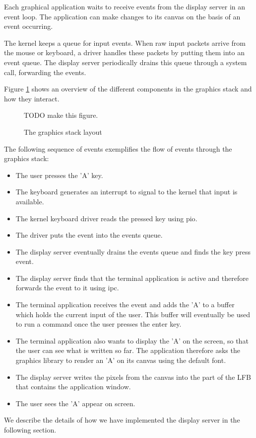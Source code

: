 \documentclass{report}
\begin{document}
Each graphical application waits to receive events from the display server in
an event loop. The application can make changes to its canvas on the basis of
an event occurring.

The kernel keeps a queue for input events. When raw input packets arrive from
the mouse or keyboard, a driver handles these packets by putting them into an
event queue. The display server periodically drains this queue through a
system call, forwarding the events.

Figure \ref{graphicslayout} shows an overview of the different components in
the graphics stack and how they interact. 
\begin{figure}[h!]
\begin{framed}
TODO make this figure.
\end{framed}
\caption{The graphics stack layout}
\label{graphicslayout}
\end{figure}

The following sequence of events exemplifies the flow of events through the
graphics stack:
\begin{itemize}
\item The user presses the 'A' key.
\item The keyboard generates an interrupt to signal to the kernel that input
is available.
\item The kernel keyboard driver reads the pressed key using \gls{pio}.
\item The driver puts the event into the events queue.
\item The display server eventually drains the events queue and finds the key
press event.
\item The display server finds that the terminal application is active and
therefore forwards the event to it using \gls{ipc}.
\item The terminal application receives the event and adds the 'A' to a buffer
which holds the current input of the user. This buffer will eventually be used
to run a command once the user presses the enter key.
\item The terminal application also wants to display the 'A' on the screen, so
that the user can see what is written so far. The application therefore asks
the graphics library to render an 'A' on its canvas using the default font.
\item The display server writes the pixels from the canvas into the part of the
LFB that contains the application window.
\item The user sees the 'A' appear on screen.
\end{itemize}
We describe the details of how we have implemented the display server in the
following section.
\end{document}
